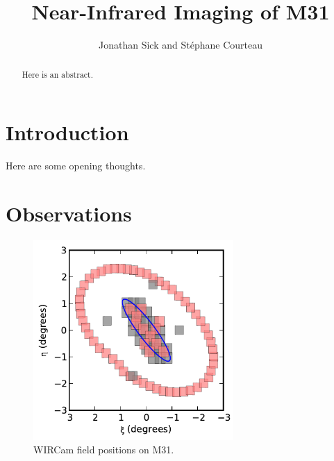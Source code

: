 \documentclass[iop]{emulateapj}
\begin{document}
\title{Near-Infrared Imaging of M31}
\author{Jonathan Sick and Stéphane Courteau}

\begin{abstract}
Here is an abstract.
\end{abstract}

\section{Introduction}

Here are some opening thoughts.

\section{Observations}
\label{sec:Observations}

\begin{figure}[t]
	\centering
		\includegraphics[height=3in]{figs/fieldmap}
	\caption{WIRCam field positions on M31.}
	\label{fig:fieldmap}
\end{figure}
\end{document}
